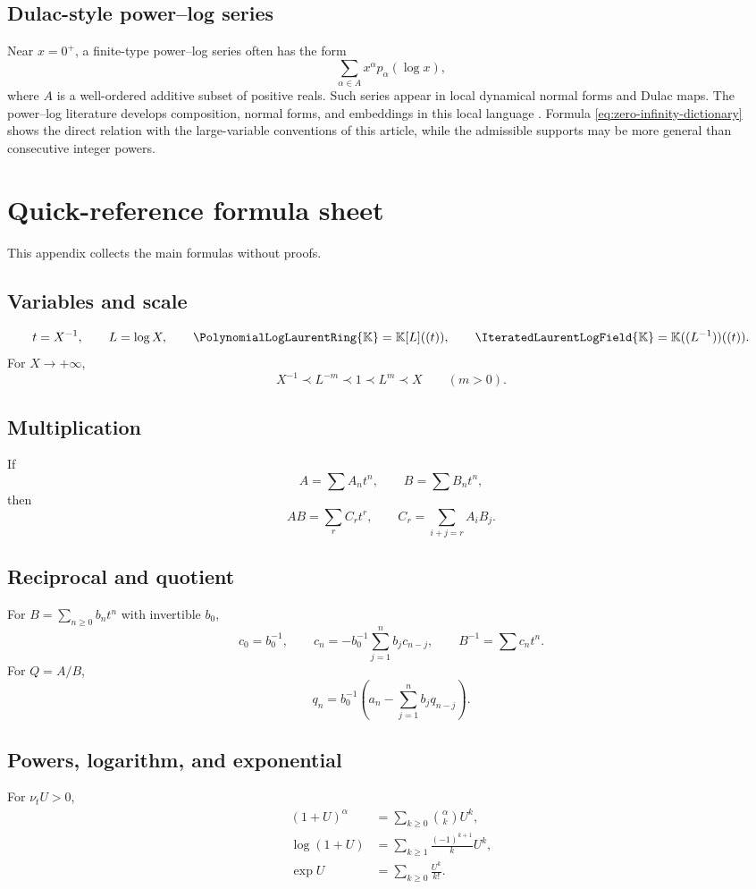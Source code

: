 \documentclass[11pt,oneside]{book}
\theoremstyle{definition}
\theoremstyle{remark}
\newcommand{\K}{\mathbb K}
\newcommand{\PLpoly}{\PolynomialLogLaurentRing{\K}}
\newcommand{\PLfield}{\IteratedLaurentLogField{\K}}
\newcommand{\precdom}{\prec}
\begin{document}
\section{Dulac-style power--log series}
Near $x=0^+$, a finite-type power--log series often has the form
\[
 \sum_{\alpha\in A}x^\alpha p_\alpha(\log x),
\]
where $A$ is a well-ordered additive subset of positive reals. Such series
appear in local dynamical normal forms and Dulac maps. The power--log
literature develops composition, normal forms, and embeddings in this local
language \cite{MRRZ2016}. Formula \eqref{eq:zero-infinity-dictionary}
shows the direct relation with the large-variable conventions of this
article, while the admissible supports may be more general than consecutive
integer powers.

\chapter{Quick-reference formula sheet}
\label{app:quick-reference}

This appendix collects the main formulas without proofs.

\section*{Variables and scale}
\[
 t=X^{-1},\qquad L=\log X,\qquad
 \PLpoly=\K[L]((t)),\qquad
 \PLfield=\K((L^{-1}))((t)).
\]
For $X\to+\infty$,
\[
 X^{-1}\precdom L^{-m}\precdom1\precdom L^m\precdom X
 \qquad(m>0).
\]

\section*{Multiplication}
If
\[
 A=\sum A_nt^n,\qquad B=\sum B_nt^n,
\]
then
\[
 AB=\sum_rC_rt^r,\qquad
 C_r=\sum_{i+j=r}A_iB_j.
\]

\section*{Reciprocal and quotient}
For $B=\sum_{n\ge0}b_nt^n$ with invertible $b_0$,
\[
 c_0=b_0^{-1},\qquad
 c_n=-b_0^{-1}\sum_{j=1}^nb_jc_{n-j},
 \qquad B^{-1}=\sum c_nt^n.
\]
For $Q=A/B$,
\[
 q_n=b_0^{-1}\left(a_n-\sum_{j=1}^nb_jq_{n-j}\right).
\]

\section*{Powers, logarithm, and exponential}
For $\nu_tU>0$,
\begin{align*}
 (1+U)^\alpha&=\sum_{k\ge0}\binom{\alpha}{k}U^k,\\
 \log(1+U)&=\sum_{k\ge1}\frac{(-1)^{k+1}}{k}U^k,\\
 \exp U&=\sum_{k\ge0}\frac{U^k}{k!}.
\end{align*}
\end{document}
